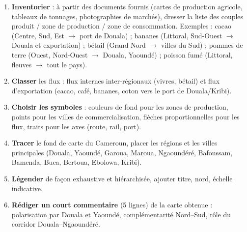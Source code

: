 \documentclass[11pt]{article}
\begin{document}
\begin{methode}
\begin{enumerate}
\item \textbf{Inventorier} : à partir des documents fournis (cartes de production agricole, tableaux de tonnages, photographies de marchés), dresser la liste des couples produit / zone de production / zone de consommation. Exemples : cacao (Centre, Sud, Est $\rightarrow$ port de Douala) ; bananes (Littoral, Sud-Ouest $\rightarrow$ Douala et exportation) ; bétail (Grand Nord $\rightarrow$ villes du Sud) ; pommes de terre (Ouest, Nord-Ouest $\rightarrow$ Douala, Yaoundé) ; poisson fumé (Littoral, fleuves $\rightarrow$ tout le pays).
\item \textbf{Classer} les flux : flux internes inter-régionaux (vivres, bétail) et flux d'exportation (cacao, café, bananes, coton vers le port de Douala/Kribi).
\item \textbf{Choisir les symboles} : couleurs de fond pour les zones de production, points pour les villes de commercialisation, flèches proportionnelles pour les flux, traits pour les axes (route, rail, port).
\item \textbf{Tracer} le fond de carte du Cameroun, placer les régions et les villes principales (Douala, Yaoundé, Garoua, Maroua, Ngaoundéré, Bafoussam, Bamenda, Buea, Bertoua, Ebolowa, Kribi).
\item \textbf{Légender} de façon exhaustive et hiérarchisée, ajouter titre, nord, échelle indicative.
\item \textbf{Rédiger un court commentaire} (5 lignes) de la carte obtenue : polarisation par Douala et Yaoundé, complémentarité Nord--Sud, rôle du corridor Douala--Ngaoundéré.
\end{enumerate}
\end{methode}
\end{document}
